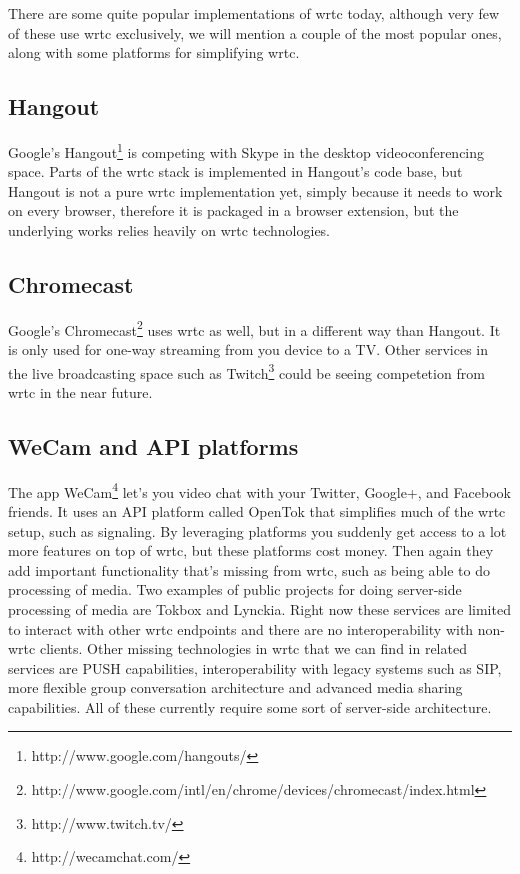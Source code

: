 
There are some quite popular implementations of \gls{wrtc} today, although very few of these use \gls{wrtc} exclusively, we will mention a couple of the most popular ones, along with some platforms for simplifying \gls{wrtc}.

\subsection{Hangout}
Google's Hangout\footnote{http://www.google.com/hangouts/} is competing with Skype in the desktop videoconferencing space. Parts of the \gls{wrtc} stack is implemented in Hangout's code base, but Hangout is not a pure \gls{wrtc} implementation yet, simply because it needs to work on every browser, therefore it is packaged in a browser extension, but the underlying works relies heavily on \gls{wrtc} technologies.

\subsection{Chromecast}
Google's Chromecast\footnote{http://www.google.com/intl/en/chrome/devices/chromecast/index.html} uses \gls{wrtc} as well, but in a different way than Hangout. It is only used for one-way streaming from you device to a TV. Other services in the live broadcasting space such as Twitch\footnote{http://www.twitch.tv/} could be seeing competetion from \gls{wrtc} in the near future.

\subsection{WeCam and API platforms}
The app WeCam\footnote{http://wecamchat.com/} let's you video chat with your Twitter, Google+, and Facebook friends. It uses an API platform called OpenTok that simplifies much of the \gls{wrtc} setup, such as signaling. By leveraging platforms you suddenly get access to a lot more features on top of \gls{wrtc}, but these platforms cost money. Then again they add important functionality that's missing from \gls{wrtc}, such as being able to do processing of media. Two examples of public projects for doing server-side processing of media are Tokbox and Lynckia. Right now these services are limited to interact with other \gls{wrtc} endpoints and there are no interoperability with non-\gls{wrtc} clients. Other missing technologies in \gls{wrtc} that we can find in related services are PUSH capabilities, interoperability with legacy systems such as SIP, more flexible group conversation architecture and advanced media sharing capabilities. All of these currently require some sort of server-side architecture.

